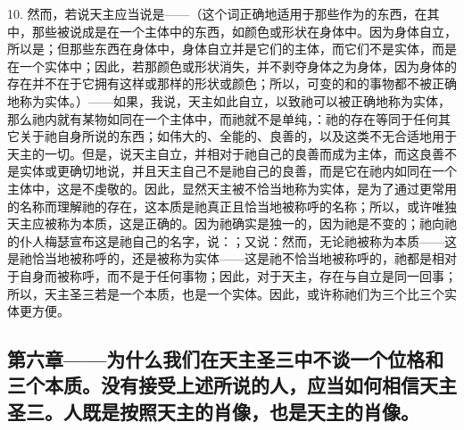 10. 然而，若说天主应当说是——（这个词正确地适用于那些作为的东西，在其中，那些被说成是在一个主体中的东西，如颜色或形状在身体中。因为身体自立，所以是；但那些东西在身体中，身体自立并是它们的主体，而它们不是实体，而是在一个实体中；因此，若那颜色或形状消失，并不剥夺身体之为身体，因为身体的存在并不在于它拥有这样或那样的形状或颜色；所以，可变的和的事物都不被正确地称为实体。）——如果，我说，天主如此自立，以致祂可以被正确地称为实体，那么祂内就有某物如同在一个主体中，而祂就不是单纯，：祂的存在等同于任何其它关于祂自身所说的东西；如伟大的、全能的、良善的，以及这类不无合适地用于天主的一切。但是，说天主自立，并相对于祂自己的良善而成为主体，而这良善不是实体或更确切地说，并且天主自己不是祂自己的良善，而是它在祂内如同在一个主体中，这是不虔敬的。因此，显然天主被不恰当地称为实体，是为了通过更常用的名称而理解祂的存在，这本质是祂真正且恰当地被称呼的名称；所以，或许唯独天主应被称为本质，这是正确的。因为祂确实是独一的，因为祂是不变的；祂向祂的仆人梅瑟宣布这是祂自己的名字，说：；又说：然而，无论祂被称为本质——这是祂恰当地被称呼的，还是被称为实体——这是祂不恰当地被称呼的，祂都是相对于自身而被称呼，而不是于任何事物；因此，对于天主，存在与自立是同一回事；所以，天主圣三若是一个本质，也是一个实体。因此，或许称祂们为三个比三个实体更方便。\par


\subsection{第六章——为什么我们在天主圣三中不谈一个位格和三个本质。没有接受上述所说的人，应当如何相信天主圣三。人既是按照天主的肖像，也是天主的肖像。}

